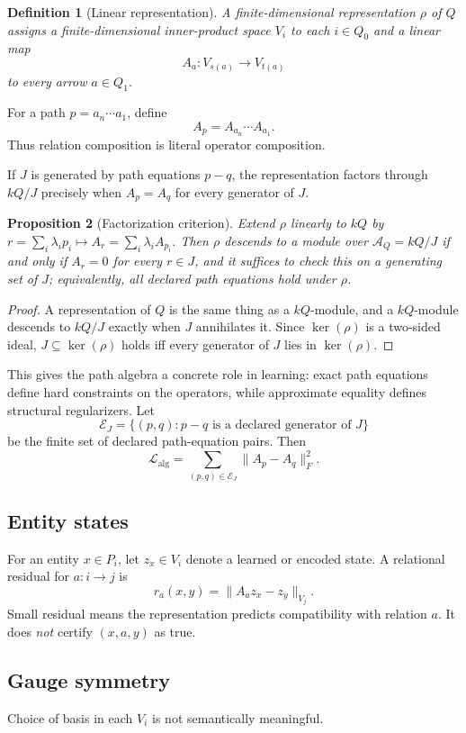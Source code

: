 \documentclass[11pt]{article}
\newtheorem{definition}{Definition}[section]
\newtheorem{proposition}[definition]{Proposition}
\newcommand{\A}{\mathcal{A}}
\newcommand{\Lcal}{\mathcal{L}}
\begin{document}
\begin{definition}[Linear representation]
A finite-dimensional representation $\rho$ of $Q$ assigns a finite-dimensional inner-product space $V_i$ to each $i\in Q_0$ and a linear map
\[
A_a:V_{s(a)}\to V_{t(a)}
\]
to every arrow $a\in Q_1$.
\end{definition}

For a path $p=a_n\cdots a_1$, define
\[
A_p=A_{a_n}\cdots A_{a_1}.
\]
Thus relation composition is literal operator composition.

If $J$ is generated by path equations $p-q$, the representation factors through $kQ/J$ precisely when $A_p=A_q$ for every generator of $J$.

\begin{proposition}[Factorization criterion]
\label{prop:factorization}
Extend $\rho$ linearly to $kQ$ by $r=\sum_i \lambda_i p_i \mapsto A_r=\sum_i\lambda_i A_{p_i}$. Then $\rho$ descends to a module over $\A_Q=kQ/J$ if and only if $A_r=0$ for every $r\in J$, and it suffices to check this on a generating set of $J$; equivalently, all declared path equations hold under $\rho$.
\end{proposition}
\begin{proof}
A representation of $Q$ is the same thing as a $kQ$-module, and a $kQ$-module descends to $kQ/J$ exactly when $J$ annihilates it. Since $\ker(\rho)$ is a two-sided ideal, $J\subseteq\ker(\rho)$ holds iff every generator of $J$ lies in $\ker(\rho)$.
\end{proof}

This gives the path algebra a concrete role in learning: exact path equations define hard constraints on the operators, while approximate equality defines structural regularizers. Let
\[
\mathcal{E}_J=\{(p,q): p-q\text{ is a declared generator of }J\}
\]
be the finite set of declared path-equation pairs. Then
\[
\Lcal_{\mathrm{alg}}=\sum_{(p,q)\in\mathcal{E}_J}\|A_p-A_q\|_F^2 .
\]

\subsection{Entity states}
\label{sec:entity-states}
For an entity $x\in P_i$, let $z_x\in V_i$ denote a learned or encoded state. A relational residual for $a:i\to j$ is
\[
r_a(x,y)=\|A_a z_x-z_y\|_{V_j}.
\]
Small residual means the representation predicts compatibility with relation $a$. It does \emph{not} certify $(x,a,y)$ as true.

\subsection{Gauge symmetry}
Choice of basis in each $V_i$ is not semantically meaningful.
\end{document}
